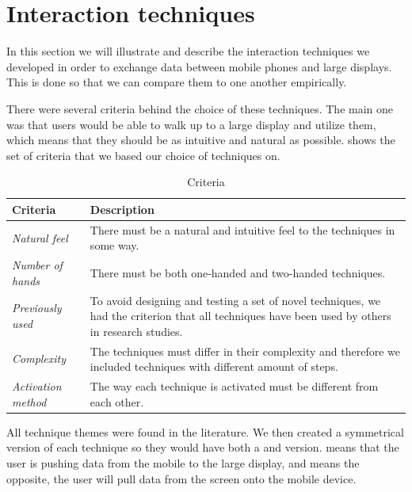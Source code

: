 \section{Interaction techniques} \label{sec:techniques}
In this section we will illustrate and describe the interaction techniques we developed in order to exchange data between mobile phones and large displays.
This is done so that we can compare them to one another empirically.

There were several criteria behind the choice of these techniques. 
The main one was that users would be able to walk up to a large display and utilize them, which means that they should be as intuitive and natural as possible. 
 shows the set of criteria that we based our choice of techniques on.

\begin{table}[H]
	\centering
	\def\arraystretch{1.5}
	\begin{tabular}{p{} p{}}
		\hline
		\textbf{Criteria} & \textbf{Description} \\ \hline
		\textit{Natural feel} & There must be a natural and intuitive feel to the techniques in some way. \\ \hline
		\textit{Number of hands} & There must be both one-handed and two-handed techniques. \\ \hline
		\textit{Previously used} & To avoid designing and testing a set of novel techniques, we had the criterion that all techniques have been used by others in research studies. \\ \hline
		\textit{Complexity} & The techniques must differ in their complexity and therefore we included techniques with different amount of steps. \\ \hline
		\textit{Activation method} & The way each technique is activated must be different from each other. \\ \hline
	\end{tabular}
	\caption{Criteria}
	\label{tab:techniqueCriteria}
\end{table}


All technique themes were found in the literature.
We then created a symmetrical version of each technique so they would have both a \push and \pull version.
\push means that the user is pushing data from the mobile to the large display, and \pull means the opposite, the user will pull data from the screen onto the mobile device. 

